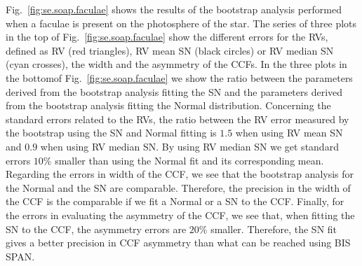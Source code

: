 \documentclass[11pt, oneside]{article}
\begin{document}
Fig.~\ref{fig:se.soap.faculae} shows the results of the bootstrap analysis performed when a faculae is present on the photosphere of the star. The series of three plots in the top of Fig.~\ref{fig:se.soap.faculae} show the different errors for the RVs, defined as RV (red triangles), RV mean SN (black circles) or RV median SN (cyan crosses), the width and the asymmetry of the CCFs. In the three plots in the bottomof Fig.~\ref{fig:se.soap.faculae} we show the ratio between the parameters derived from the bootstrap analysis fitting the SN and the parameters derived from the bootstrap analysis fitting the Normal distribution. Concerning the standard errors related to the RVs, the ratio between the RV error measured by the bootstrap using the SN and Normal fitting is $1.5$ when using RV mean SN and $0.9$ when using RV median SN. By using RV median SN we get standard errors $10\%$ smaller than using the Normal fit and its corresponding mean. Regarding the errors in width of the CCF, we see that the bootstrap analysis for the Normal and the SN are comparable. Therefore, the precision in the width of the CCF is the comparable if we fit a Normal or a SN to the CCF. Finally, for the errors in evaluating the asymmetry of the CCF, we see that, when fitting the SN to the CCF, the asymmetry errors are $20\%$ smaller. Therefore, the SN fit gives a better precision in CCF asymmetry than what can be reached using BIS SPAN.
\end{document}
